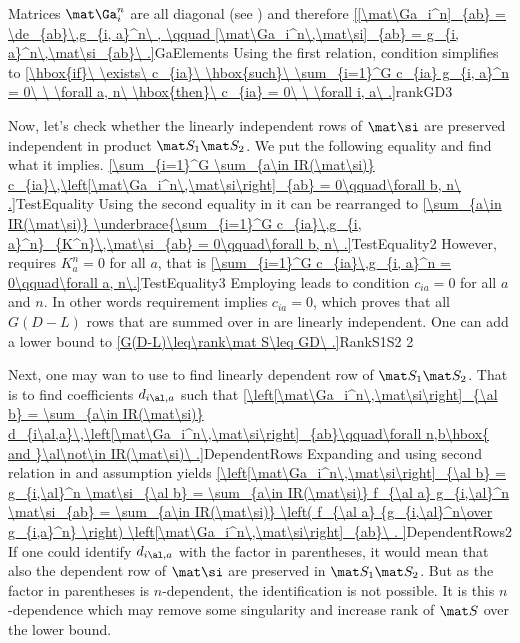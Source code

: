 Matrices $\mat\Ga_i^n$ are all diagonal (see ) and therefore
\eqref{[\mat\Ga_i^n]_{ab} = \de_{ab}\,g_{i, a}^n\ , \qquad [\mat\Ga_i^n\,\mat\si]_{ab} = g_{i, a}^n\,\mat\si_{ab}\ .}{GaElements}
Using the first relation, condition  simplifies to
\eqref{\hbox{if}\ \exists\ c_{ia}\ \hbox{such}\ \sum_{i=1}^G c_{ia} g_{i, a}^n = 0\ \ \forall a, n\ \hbox{then}\ c_{ia} = 0\ \ \forall i, a\ .}{rankGD3}

Now, let's check whether the linearly independent rows of $\mat\si$ are preserved independent in product $\mat S_1\mat S_2$. We put the following equality and find what it implies.
\eqref{\sum_{i=1}^G \sum_{a\in IR(\mat\si)} c_{ia}\,\left[\mat\Ga_i^n\,\mat\si\right]_{ab} = 0\qquad\forall b, n\ .}{TestEquality}
Using the second equality in  it can be rearranged to
\eqref{\sum_{a\in IR(\mat\si)} \underbrace{\sum_{i=1}^G c_{ia}\,g_{i, a}^n}_{K^n}\,\mat\si_{ab} = 0\qquad\forall b, n\ .}{TestEquality2}
However,  requires $K^n_a = 0$ for all $a$, that is
\eqref{\sum_{i=1}^G c_{ia}\,g_{i, a}^n = 0\qquad\forall a, n\.}{TestEquality3}
Employing  leads to condition $c_{ia} = 0$ for all $a$ and $n$. In other words requirement  implies $c_{ia} = 0$, which proves that all $G(D-L)$ rows that are summed over in  are linearly independent. One can add a lower bound to 
\eqref{G(D-L)\leq\rank\mat S\leq GD\ .}{RankS1S2 2}

Next, one may wan to use  to find linearly dependent row of $\mat S_1\mat S_2$. That is to find coefficients $d_{i\al,a}$ such that
\eqref{\left[\mat\Ga_i^n\,\mat\si\right]_{\al b} = \sum_{a\in IR(\mat\si)} d_{i\al,a}\,\left[\mat\Ga_i^n\,\mat\si\right]_{ab}\qquad\forall n,b\hbox{ and }\al\not\in IR(\mat\si)\ .}{DependentRows}
Expanding \lhs{} and using second relation in  and assumption  yields
\eqref{\left[\mat\Ga_i^n\,\mat\si\right]_{\al b} 
= g_{i,\al}^n \mat\si_{\al b}
= \sum_{a\in IR(\mat\si)} f_{\al a} g_{i,\al}^n \mat\si_{ab}
= \sum_{a\in IR(\mat\si)} \left( f_{\al a} {g_{i,\al}^n\over g_{i,a}^n} \right) \left[\mat\Ga_i^n\,\mat\si\right]_{ab}\ .
}{DependentRows2}
If one could identify $d_{i\al,a}$ with the factor in parentheses, it would mean that also the dependent row of $\mat\si$ are preserved in $\mat S_1\mat S_2$. But as the factor in parentheses is $n$-dependent, the identification is not possible. It is this $n$-dependence which may remove some singularity and increase rank of $\mat S$ over the lower bound.



